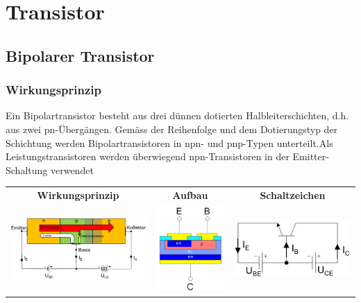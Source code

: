 
\section{Transistor}
\vspace{-0.2cm}
\subsection{Bipolarer Transistor}
\vspace{-0.2cm}
\subsubsection{Wirkungsprinzip}
Ein Bipolartransistor besteht aus drei dünnen dotierten Halbleiterschichten, d.h. aus zwei pn-Übergängen. \newline Gemäss der Reihenfolge und dem Dotierungstyp der Schichtung werden Bipolartransistoren in npn- und pnp-Typen unterteilt.\newline Als Leistungstransistoren werden überwiegend npn-Transistoren in der Emitter-Schaltung verwendet\newline
\hspace*{2cm}
\begin{tabular}{ccc}
     \textbf{Wirkungsprinzip}&\textbf{Aufbau}&\textbf{Schaltzeichen}\\
     \includegraphics[width=0.35\linewidth]{images/npnTransistor}&
     \includegraphics[width=0.15\linewidth]{images/aufbautransnpn}&
     \includegraphics[width=0.25\linewidth]{images/esbtransnpn} \\
\end{tabular}


